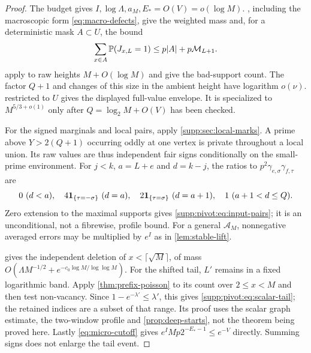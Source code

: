 \begin{proof}
The budget gives $I,\log\Lambda,a_M,E_*=O(V)=o(\log M)$.
, including the macroscopic form
\eqref{eq:macro-defects}, give the weighted mass and, for a deterministic
mask $A\subset U$, the bound
\[
 \sum_{x\in A}\mathbb P(J_{x,L}=1)
 \le p|A|+p\mathcal M_{L+1}.
\]
 apply to raw heights
$M+O(\log M)$ and give the bad-support count. The factor $Q+1$ and
changes of this size in the ambient height have logarithm $o(\nu)$.
 restricted to $U$ gives the displayed
full-value envelope. It is specialized to $M^{5/3+o(1)}$ only after
$Q=\log_2M+O(V)$ has been checked.

For the signed marginals and local pairs, apply
\cref{supp:sec:local-marks}. A prime above $Y>2(Q+1)$ occurring oddly at
one vertex is private throughout a local union. Its raw values are thus
independent fair signs conditionally on the small-prime environment.
For $j<k$, $a=L+e$ and $d=k-j$, the ratios to
$p^2\gamma_{e,\sigma}\gamma_{f,\tau}$ are
\[
 0\ (d<a),\quad4\1_{\{\tau=-\sigma\}}\ (d=a),\quad
 2\1_{\{\tau=\sigma\}}\ (d=a+1),\quad1\ (a+1<d\le Q).
\]
Zero extension to the maximal supports gives
\eqref{supp:pivot:eq:input-pairs}; it is an unconditional, not a
fibrewise, profile bound. For a general $\mathcal A_M$, nonnegative
averaged errors may be multiplied by $e^I$ as in
\cref{lem:stable-lift}.

 gives the independent deletion of
$x<\lceil\sqrt M\rceil$, of mass
$O(\Lambda M^{-1/2}+e^{-c_0\log M/\log\log M})$.
For the shifted tail, $L'$ remains in a fixed logarithmic band.
Apply \cref{thm:prefix-poisson} to its count over $2\le x<M$ and then
test non-vacancy. Since $1-e^{-\lambda'}\le\lambda'$, this gives
\eqref{supp:pivot:eq:scalar-tail}; the retained indices are a subset of
that range. Its proof uses the scalar graph estimate, the two-window
profile and \cref{prop:deep-starts}, not the theorem being proved here.
Lastly \eqref{eq:micro-cutoff} gives
$e^IMp2^{-E_*-1}\le e^{-V}$ directly. Summing signs does not enlarge
the tail event.
\end{proof}

